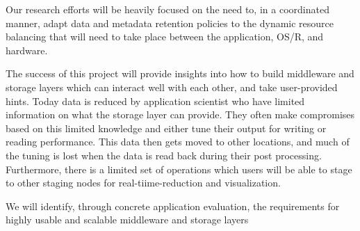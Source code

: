 \documentclass[11pt,letterpaper]{article}
\begin{document}
Our research efforts will be heavily focused on the need to, in a coordinated
manner, adapt data and metadata retention policies to the dynamic
resource balancing that will need to take place between the application,
OS/R, and hardware.

The success of this project will  provide insights into how to build middleware and storage layers which can interact
well with each other, and take user-provided hints. Today data is reduced by application scientist who have 
limited information on what the storage layer can provide. They often make compromises based on this limited knowledge
and either tune their output for writing or reading performance. This data then gets moved to other locations, and much of
the tuning is lost when the data is read back during their post processing. Furthermore, there is a limited set of operations
which users will be able to stage to other staging nodes for real-tiime-reduction and visualization. 

We will identify,   through concrete application evaluation, the requirements for highly 
usable and scalable middleware and storage layers




%
\end{document}
